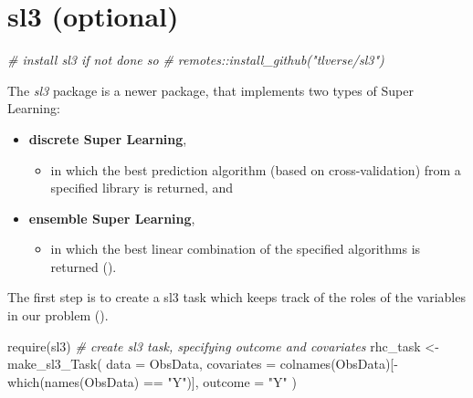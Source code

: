 \documentclass[
]{book}
\newenvironment{Shaded}{\begin{snugshade}}{\end{snugshade}}
\newcommand{\AttributeTok}[1]{\textcolor[rgb]{0.77,0.63,0.00}{#1}}
\newcommand{\CommentTok}[1]{\textcolor[rgb]{0.56,0.35,0.01}{\textit{#1}}}
\newcommand{\FunctionTok}[1]{\textcolor[rgb]{0.00,0.00,0.00}{#1}}
\newcommand{\NormalTok}[1]{#1}
\newcommand{\OtherTok}[1]{\textcolor[rgb]{0.56,0.35,0.01}{#1}}
\newcommand{\SpecialCharTok}[1]{\textcolor[rgb]{0.00,0.00,0.00}{#1}}
\newcommand{\StringTok}[1]{\textcolor[rgb]{0.31,0.60,0.02}{#1}}
\providecommand{\tightlist}{%
  \setlength{\itemsep}{0pt}\setlength{\parskip}{0pt}}
\begin{document}
\hypertarget{sl3-optional}{%
\section{sl3 (optional)}\label{sl3-optional}}

\begin{Shaded}
\begin{Highlighting}[]
\CommentTok{\# install sl3 if not done so}
\CommentTok{\# remotes::install\_github("tlverse/sl3")}
\end{Highlighting}
\end{Shaded}

The \emph{sl3} package is a newer package, that implements two types of Super Learning:

\begin{itemize}
\tightlist
\item
  \textbf{discrete Super Learning},

  \begin{itemize}
  \tightlist
  \item
    in which the best prediction algorithm (based on cross-validation) from a specified library is returned, and
  \end{itemize}
\item
  \textbf{ensemble Super Learning},

  \begin{itemize}
  \tightlist
  \item
    in which the best linear combination of the specified algorithms is returned (\citet{coyle2021sl3}).
  \end{itemize}
\end{itemize}

The first step is to create a sl3 task which keeps track of the roles of the variables in our problem (\citet{coyle2021tlverse}).

\begin{Shaded}
\begin{Highlighting}[]
\FunctionTok{require}\NormalTok{(sl3)}
\CommentTok{\# create sl3 task, specifying outcome and covariates }
\NormalTok{rhc\_task }\OtherTok{\textless{}{-}} \FunctionTok{make\_sl3\_Task}\NormalTok{(}
  \AttributeTok{data =}\NormalTok{ ObsData, }
  \AttributeTok{covariates =} \FunctionTok{colnames}\NormalTok{(ObsData)[}\SpecialCharTok{{-}}\FunctionTok{which}\NormalTok{(}\FunctionTok{names}\NormalTok{(ObsData) }\SpecialCharTok{==} \StringTok{"Y"}\NormalTok{)],}
  \AttributeTok{outcome =} \StringTok{"Y"}
\NormalTok{)}
\end{Highlighting}
\end{Shaded}
\end{document}
